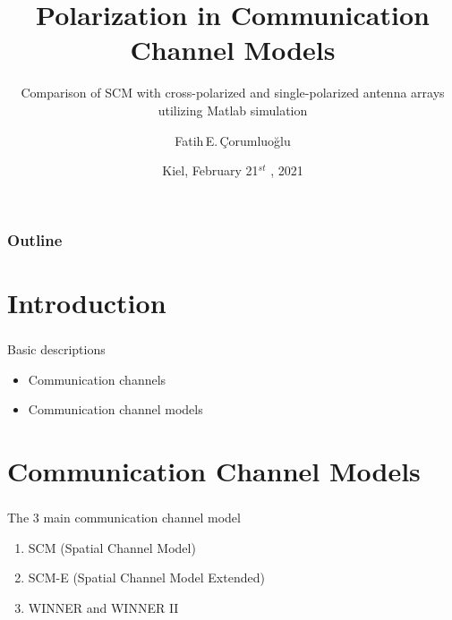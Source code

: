 \documentclass[10pt,aspectratio=169]{beamer}
\title{Polarization in Communication Channel Models}
\subtitle{Comparison of SCM with cross-polarized and single-polarized antenna arrays utilizing Matlab simulation }
\author[F.E.~Çorumluoğlu]{Fatih\,E.\,Çorumluoğlu}
\date[09.02.2021]{Kiel, February 21$^{\textit{st}}$ , 2021}
\institute {Kiel University}
\begin{document}
	
	\setcounter{tocdepth}{1}
	\frame[plain]{\titlepage      %
		\setcounter{framenumber}{0}}  %
	
	
	
	\begin{frame}
		\frametitle{Outline}
		\setcounter{tocdepth}{1}
		\tableofcontents
	\end{frame}
	
	\section{Introduction}
	\begin{frame}
		\frametitle{\insertsection}
		\framesubtitle{\insertsubsection}
		Basic descriptions
        
\begin{itemize}
\item Communication channels
\end{itemize}
\begin{itemize}
\item Communication channel models

\end{itemize}
	\end{frame}
	\section{Communication Channel Models}
	\begin{frame}
		\frametitle{\insertsection}
		\framesubtitle{\insertsubsection}
		The 3 main communication channel model
        
\begin{enumerate}
\item SCM (Spatial Channel Model)
\item SCM-E (Spatial Channel Model Extended)
\item WINNER and WINNER II
\end{enumerate}
	\end{frame}
	
\end{document}
